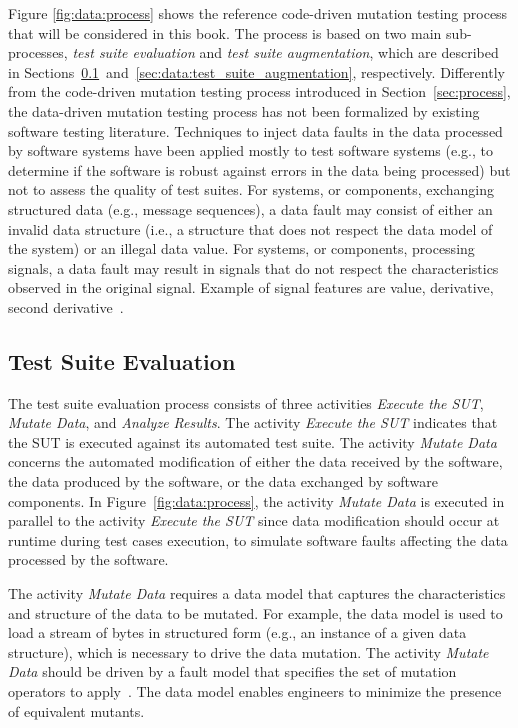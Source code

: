 Figure \ref{fig:data:process} shows the reference code-driven mutation testing process that will be considered in this book. The process is based on two main sub-processes, \emph{test suite evaluation} and \emph{test suite augmentation}, which are described in Sections~\ref{sec:data:test_suite_evaluation}~and~\ref{sec:data:test_suite_augmentation}, respectively. Differently from the code-driven mutation testing process introduced in Section~\ref{sec:process}, the data-driven mutation testing process has not been formalized by existing software testing literature. 
Techniques to inject data faults in the data processed by software systems have been applied mostly to test software systems (e.g., to determine if the software is robust against errors in the data being processed) but not to assess the quality of test suites.
For systems, or components, exchanging structured data (e.g., message sequences), a data fault may consist of either an invalid data structure (i.e., a structure that does not respect the data model of the system) or an illegal data value.
For systems, or components, processing signals, a data fault may result in signals that do not respect the characteristics observed in the original signal. Example of signal features are value, derivative, second derivative~\cite{Matinnejad19}.

\subsection{Test Suite Evaluation} %
\label{sec:data:test_suite_evaluation}

The test suite evaluation process consists of three activities \emph{Execute the SUT}, \emph{Mutate Data},  and \emph{Analyze Results}.
The activity \emph{Execute the SUT} indicates that the SUT is executed against its automated test suite. 
The activity \emph{Mutate Data} concerns the automated modification of either the data received by the software, the data produced by the software, or the data exchanged by software components.
In Figure~\ref{fig:data:process}, the activity \emph{Mutate Data} is executed in parallel to the activity \emph{Execute the SUT} since data modification should occur at runtime during test cases execution, to simulate software faults affecting the data processed by the software.

The activity \emph{Mutate Data} requires a data model that captures the characteristics and structure of the data to be mutated. 
For example, the data model is used to load a stream of bytes in structured form (e.g., an instance of a given data structure), which is necessary to drive the data mutation. 
The activity \emph{Mutate Data} should be driven by a fault model that specifies the set of mutation operators to apply~\cite{di2015generating}. 
The data model enables engineers to minimize the presence of equivalent mutants.


